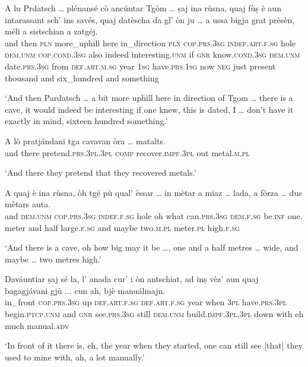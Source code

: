 \begin{linenumbers}
\gll A lu Prdatsch … plénansé cò ancúntar Tgòm … ṣaj ina rùsna, quaj fùṣ è aun intarassant sch’ ins savés, quaj datèscha da gl' òn ju … a ussa bigja grat prèsèn, méli a sistschian a zatgéj.   \\
and then \textsc{pln} {} more\_uphill here in\_direction \textsc{pln} {} \textsc{cop.prs.3sg} \textsc{indef.art.f.sg} hole \textsc{dem.unm} \textsc{cop.cond.3sg} also indeed interesting.\textsc{unm} if \textsc{gnr} know.\textsc{cond.3sg} \textsc{dem.unm} date.\textsc{prs.3sg} from \textsc{def.art.m.sg} year \textsc{1sg} {} have.\textsc{prs.1sg} now \textsc{neg} just present thousand and six\_hundred and something\\
\end{linenumbers}
\medskip
\glt `And then Pardatsch … a bit more uphill here in direction of Tgom … there is a cave, it would indeed be interesting if one knew, this is dated, I … don't have it exactly in mind, sixteen hundred something.'
\medskip

\begin{linenumbers}
\gll  A lò pratjándani tga cavavan òra … matalts.  \\
and there pretend.\textsc{prs.3pl.3pl} \textsc{comp} recover.\textsc{impf.3pl} out {} metal.\textsc{m.pl}\\
\end{linenumbers}
\medskip
\glt `And there they pretend that they recovered metals.'
\medskip

\begin{linenumbers}
\gll A quaj è ina rùsna, òh tgé pù qual' èssar … in mètar a miaz … lada, a fòrza … dus mètars auta.   \\
and \textsc{dem.unm} \textsc{cop.prs.3sg} \textsc{indef.f.sg} hole oh what  can.\textsc{prs.3sg} \textsc{dem.f.sg} be.\textsc{inf} {} one. meter and half {} large.\textsc{f.sg} and maybe {} two.\textsc{m.pl} meter.\textsc{pl} high.\textsc{f.sg}\\
\end{linenumbers}
\medskip
\glt `And there is a cave, oh how big may it be …, one and a half metres … wide, and maybe … two metres high.'
\medskip

\begin{linenumbers}
\gll Daváuntiar ṣaj sé la, l’ anada cur' i òn antschiat, ad inṣ vèz’ aun quaj bagagjávani gjù ... cun ah, bjè manuálmajn.   \\
in\_front  \textsc{cop.prs.3sg} up \textsc{def.art.f.sg} \textsc{def.art.f.sg} year when \textsc{3pl} have.\textsc{prs.3pl} begin.\textsc{ptcp.unm} and \textsc{gnr}  see.\textsc{prs.3sg} still  \textsc{dem.unm} build.\textsc{impf.3pl.3pl} down {} with eh much manual.\textsc{adv}\\
\end{linenumbers}
\medskip
\glt `In front of it there is, eh, the year when they started, one can still see [that] they used to mine with, ah, a lot manually.'
\medskip

